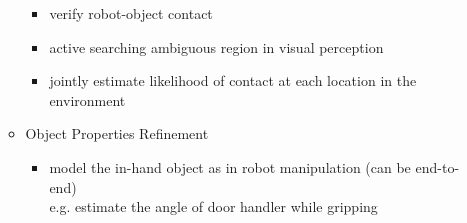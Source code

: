 \begin{itemize}
\begin{itemize}
\begin{itemize}
		\item verify robot-object contact
		\item active searching ambiguous region in visual perception
		\item jointly estimate likelihood of contact at each location in the environment
		\end{itemize}
	\item Object Properties Refinement
		\begin{itemize}
		\item model the in-hand object as in robot manipulation (can be end-to-end) \\
		e.g. estimate the angle of door handler while gripping
		\end{itemize}
	\end{itemize}
\end{itemize}